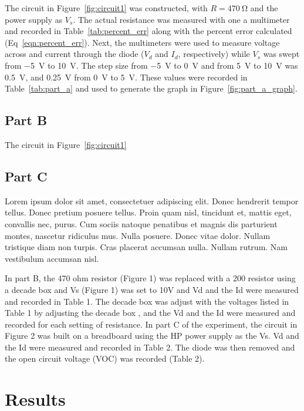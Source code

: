 \documentclass{article}
\begin{document}
The circuit in Figure~\ref{fig:circuit1} was constructed, with $R =
\SI{470}{\ohm}$ and the power supply as $V_s$.  The actual resistance
was measured with one a multimeter and recorded in
Table~\ref{tab:percent_err} along with the percent error calculated
(Eq~\ref{eqn:percent_err}).  Next, the multimeters were used to
measure voltage across and current through the diode ($V_d$ and $I_d$,
respectively) while $V_s$ was swept from \SI{-5}{V} to \SI{+10}{V}.
The step size from \SI{-5}{V} to \SI{0}{V} and from \SI{5}{V} to
\SI{10}{V} was \SI{0.5}{V}, and \SI{0.25}{V} from \SI{0}{V} to
\SI{5}{V}.  These values were recorded in Table~\ref{tab:part_a} and
used to generate the graph in Figure~\ref{fig:part_a_graph}.

\subsection{Part B}
\label{sec:proc_b}

The circuit in Figure~\ref{fig:circuit1}

\subsection{Part C}
\label{sec:proc_c}

Lorem ipsum dolor sit amet, consectetuer adipiscing elit. Donec
hendrerit tempor tellus. Donec pretium posuere tellus. Proin quam
nisl, tincidunt et, mattis eget, convallis nec, purus. Cum sociis
natoque penatibus et magnis dis parturient montes, nascetur ridiculus
mus. Nulla posuere. Donec vitae dolor. Nullam tristique diam non
turpis. Cras placerat accumsan nulla. Nullam rutrum. Nam vestibulum
accumsan nisl.

In part B, the 470 ohm resistor (Figure 1) was replaced with
a 200 resistor using a decade box and Vs (Figure 1) was set to 10V and
Vd and the Id were measured and recorded in Table 1. The decade box
was adjust with the voltages listed in Table 1 by adjusting the decade
box , and the Vd and the Id were measured and recorded for each
setting of resistance.  In part C of the experiment, the circuit in
Figure 2 was built on a breadboard using the HP power supply as the
Vs. Vd and the Id were measured and recorded in Table 2. The diode was
then removed and the open circuit voltage (VOC) was recorded (Table
2).

\section{Results}
\label{sec:results}
\end{document}
